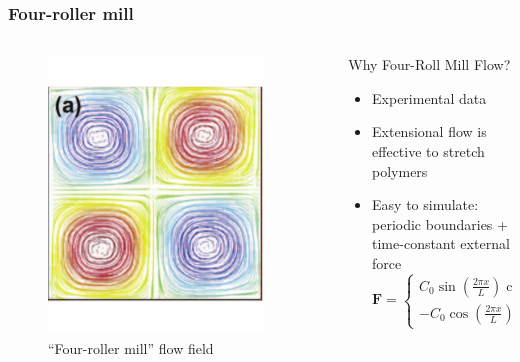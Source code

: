 \begin{frame}
  \frametitle{Four-roller mill}
  \begin{columns}
    \begin{column}{0.3\textwidth}
      \begin{figure}[t]
        \centering
        \includegraphics[width=0.9\textwidth]{img/4roll.pdf}
        \caption{``Four-roller mill'' flow field}
        \label{fig:snap}
      \end{figure}
    \end{column}
    \begin{column}{0.7\textwidth}
      \begin{block}{Why Four-Roll Mill Flow?}
        \begin{itemize}
        \item Experimental data
        \item Extensional flow is effective to  stretch polymers
        \item Easy to simulate: periodic boundaries + time-constant external force
          \begin{equation*}
            \mathbf{F}=\left\{\begin{matrix}
                C_0\sin(\frac{2\pi x} {L})\cos(\frac{2\pi y} {L})
                \\ 
                -C_0\cos(\frac{2\pi x} {L})\sin(\frac{2\pi y} {L})
              \end{matrix}\right.
   \end{equation*}
     \end{itemize}
      \end{block}
    \end{column}
  \end{columns}
\end{frame}

